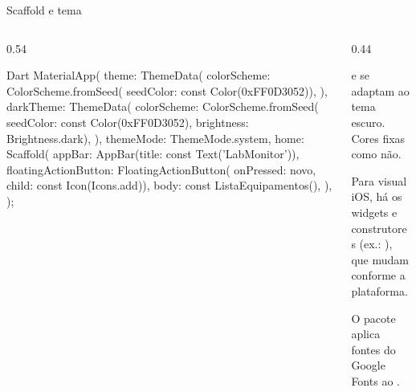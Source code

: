 \documentclass[aspectratio=169,10pt]{beamer}
\begin{document}
\begin{frame}[fragile]{Scaffold e tema}
  \begin{columns}[T]
    \begin{column}{0.54\textwidth}
\begin{codigo}[title=app.dart]{Dart}
MaterialApp(
  theme: ThemeData(
    colorScheme: ColorScheme.fromSeed(
        seedColor: const Color(0xFF0D3052)),
  ),
  darkTheme: ThemeData(
    colorScheme: ColorScheme.fromSeed(
        seedColor: const Color(0xFF0D3052),
        brightness: Brightness.dark),
  ),
  themeMode: ThemeMode.system,
  home: Scaffold(
    appBar: AppBar(title: const Text('LabMonitor')),
    floatingActionButton: FloatingActionButton(
        onPressed: novo, child: const Icon(Icons.add)),
    body: const ListaEquipamentos(),
  ),
);
\end{codigo}
    \end{column}
    \begin{column}{0.44\textwidth}
      \begin{conceito}
         e  se adaptam ao tema escuro. Cores fixas como  não.
      \end{conceito}
      \begin{dica}[Cupertino]
        Para visual iOS, há os widgets  e construtores  (ex.: ), que mudam conforme a plataforma.
      \end{dica}
      \begin{dica}
        O pacote  aplica fontes do Google Fonts ao .
      \end{dica}
    \end{column}
  \end{columns}
\end{frame}
\end{document}
